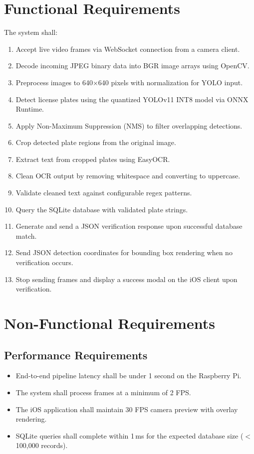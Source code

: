 \section{Functional Requirements}
The system shall:
\begin{enumerate}
    \item Accept live video frames via WebSocket connection from a camera client.
    \item Decode incoming JPEG binary data into BGR image arrays using OpenCV.
    \item Preprocess images to 640$\times$640 pixels with normalization for YOLO input.
    \item Detect license plates using the quantized YOLOv11 INT8 model via ONNX Runtime.
    \item Apply Non-Maximum Suppression (NMS) to filter overlapping detections.
    \item Crop detected plate regions from the original image.
    \item Extract text from cropped plates using EasyOCR.
    \item Clean OCR output by removing whitespace and converting to uppercase.
    \item Validate cleaned text against configurable regex patterns.
    \item Query the SQLite database with validated plate strings.
    \item Generate and send a JSON verification response upon successful database match.
    \item Send JSON detection coordinates for bounding box rendering when no verification occurs.
    \item Stop sending frames and display a success modal on the iOS client upon verification.
\end{enumerate}

\section{Non-Functional Requirements}
\subsection{Performance Requirements}
\begin{itemize}
    \item End-to-end pipeline latency shall be under 1 second on the Raspberry Pi.
    \item The system shall process frames at a minimum of 2 FPS.
    \item The iOS application shall maintain 30 FPS camera preview with overlay rendering.
    \item SQLite queries shall complete within 1\,ms for the expected database size ($<$100,000 records).
\end{itemize}

